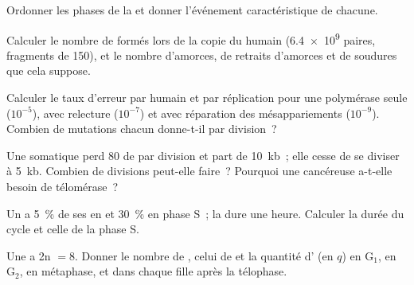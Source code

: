 \begin{exercise}[$\star$]\label{exo:b1:replication-mitosis:4}
Ordonner les phases de la  et donner l'événement caractéristique
de chacune.
\end{exercise}

\begin{exercise}[$\star\star$]\label{exo:b1:replication-mitosis:5}
Calculer le nombre de  formés lors de la copie du
 humain (\num{6.4e9} paires, fragments de \qty{150}{}), et le
nombre d'amorces, de retraits d'amorces et de soudures que cela suppose.
\end{exercise}

\begin{exercise}[$\star\star$]\label{exo:b1:replication-mitosis:6}
Calculer le taux d'erreur par  humain et par réplication pour une
polymérase seule ($10^{-5}$), avec relecture ($10^{-7}$) et avec
réparation des mésappariements ($10^{-9}$). Combien de mutations chacun
donne-t-il par division~?
\end{exercise}

\begin{exercise}[$\star\star$]\label{exo:b1:replication-mitosis:7}
Une  somatique perd \qty{80}{}  de  par
division et part de \qty{10}{kb}~; elle cesse de se diviser à
\qty{5}{kb}. Combien de divisions peut-elle faire~? Pourquoi une 
cancéreuse a-t-elle besoin de télomérase~?
\end{exercise}

\begin{exercise}[$\star\star$]\label{exo:b1:replication-mitosis:8}
Un  a \qty{5}{\%} de ses  en  et \qty{30}{\%} en
phase S~; la  dure une heure. Calculer la durée du cycle et celle
de la phase S.
\end{exercise}

\begin{exercise}[$\star\star$]\label{exo:b1:replication-mitosis:9}
Une  a 2n $= 8$. Donner le nombre de , celui de
 et la quantité d' (en $q$) en G$_1$, en G$_2$, en
métaphase, et dans chaque fille après la télophase.
\end{exercise}

